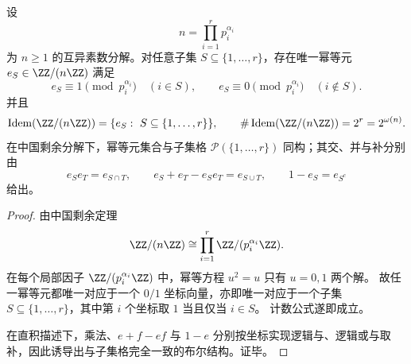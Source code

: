 \begin{corollary}\label{cor:fold-mod-semirings-idempotents-crt-boolean}
设
\[
n=\prod_{i=1}^r p_i^{\alpha_i}
\]
为 \(n\ge 1\) 的互异素数分解。对任意子集 \(S\subseteq \{1,\dots,r\}\)，存在唯一幂等元 \(e_S\in \ZZ/(n\ZZ)\) 满足
\[
e_S\equiv 1\pmod{p_i^{\alpha_i}}\quad(i\in S),
\qquad
e_S\equiv 0\pmod{p_i^{\alpha_i}}\quad(i\notin S).
\]
并且
\[
\operatorname{Idem}(\ZZ/(n\ZZ))
=
\{e_S:\ S\subseteq \{1,\dots,r\}\},
\qquad
\#\operatorname{Idem}(\ZZ/(n\ZZ))=2^r=2^{\omega(n)}.
\]
在中国剩余分解下，幂等元集合与子集格 \(\mathcal P(\{1,\dots,r\})\) 同构；其交、并与补分别由
\[
e_S e_T=e_{S\cap T},
\qquad
e_S+e_T-e_Se_T=e_{S\cup T},
\qquad
1-e_S=e_{S^c}
\]
给出。
\end{corollary}
\begin{proof}
由中国剩余定理
\[
\ZZ/(n\ZZ)\cong \prod_{i=1}^r \ZZ/(p_i^{\alpha_i}\ZZ).
\]
在每个局部因子 \(\ZZ/(p_i^{\alpha_i}\ZZ)\) 中，幂等方程 \(u^2=u\) 只有 \(u=0,1\) 两个解。
故任一幂等元都唯一对应于一个 \(0/1\) 坐标向量，亦即唯一对应于一个子集 \(S\subseteq \{1,\dots,r\}\)，其中第 \(i\) 个坐标取 \(1\) 当且仅当 \(i\in S\)。
计数公式遂即成立。

在直积描述下，乘法、\(e+f-ef\) 与 \(1-e\) 分别按坐标实现逻辑与、逻辑或与取补，因此诱导出与子集格完全一致的布尔结构。证毕。
\end{proof}

